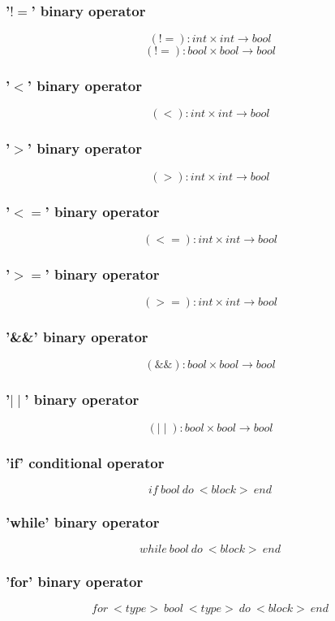 \documentclass{article}
\begin{document}
\subsubsection{'$!=$' binary operator}
$$
(!=): int \times int \longrightarrow bool
$$
$$
(!=): bool \times bool \longrightarrow bool
$$

\subsubsection{'$<$' binary operator}
$$
(<): int \times int \longrightarrow bool
$$

\subsubsection{'$>$' binary operator}
$$
(>): int \times int \longrightarrow bool
$$
\subsubsection{'$<=$' binary operator}
$$
(<=): int \times int \longrightarrow bool
$$
\subsubsection{'$>=$' binary operator}
$$
(>=): int \times int \longrightarrow bool
$$
\subsubsection{'\&\&' binary operator}
$$
(\&\&): bool \times bool \longrightarrow bool
$$
\subsubsection{'$\mid\mid$' binary operator}
$$
(\mid\mid): bool \times bool \longrightarrow bool
$$
\subsubsection{'if' conditional operator}
$$
if \ bool \ do \ <block> \ end
$$
\subsubsection{'while' binary operator}
$$
while \ bool \ do \ <block> \ end
$$
\subsubsection{'for' binary operator}
$$
for \ <type> \ bool \ <type> \ do \ <block> \ end
$$
\end{document}
